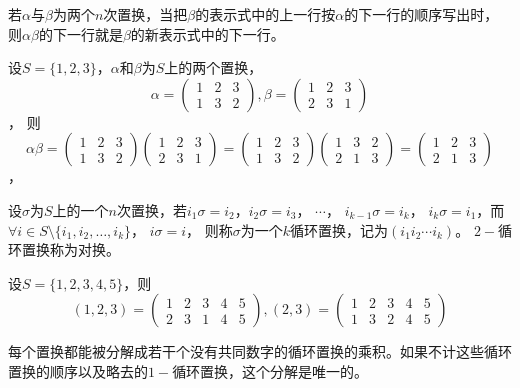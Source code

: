    若$\alpha$与$\beta$为两个$n$次置换，当把$\beta$的表示式中的上一行按$\alpha$的下一行的顺序写出时，则$\alpha \beta$的下一行就是$\beta$的新表示式中的下一行。
  \begin{Example}
    设$S=\{1,2,3\}$，$\alpha$和$\beta$为$S$上的两个置换，
    \[\alpha=\begin{pmatrix}1&2&3\\1&3&2\end{pmatrix},\beta=\begin{pmatrix}1&2&3\\2&3&1\end{pmatrix}\]，
    则
    \[\alpha\beta=\begin{pmatrix}1&2&3\\1&3&2\end{pmatrix}\begin{pmatrix}1&2&3\\2&3&1\end{pmatrix}=\begin{pmatrix}1&2&3\\1&3&2\end{pmatrix}\begin{pmatrix}1&3&2\\2&1&3\end{pmatrix}=\begin{pmatrix}1&2&3\\2&1&3\end{pmatrix}\]，    
  \end{Example}   
   \begin{Def}
     设$\sigma$为$S$上的一个$n$次置换，若$i_1\sigma=i_2$，$i_2\sigma = i_3$， $\cdots$， $i_{k-1}\sigma = i_k$， $i_k\sigma = i_1$，而$\forall i \in S\setminus \{i_1, i_2, \ldots, i_k\}$， $i\sigma = i$，
     则称$\sigma$为一个$k$循环置换，记为$(i_1i_2\cdots i_k)$。 $2-$循环置换称为对换。
   \end{Def}
   \begin{Example}
   设$S=\{1,2,3,4,5\}$，则\[(1,2,3)=\begin{pmatrix}1&2&3&4&5\\2&3&1&4&5\end{pmatrix},(2,3)=\begin{pmatrix}1&2&3&4&5\\1&3&2&4&5\end{pmatrix}\]     
   \end{Example}
   \begin{Thm}
    每个置换都能被分解成若干个没有共同数字的循环置换的乘积。如果不计这些循环置换的顺序以及略去的$1-$循环置换，这个分解是唯一的。
   \end{Thm}

